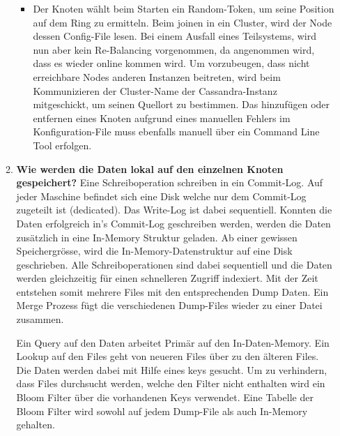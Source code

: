 \documentclass[a4paper,10pt,titlepage=false]{scrreprt}
\begin{document}
\begin{itemize}
\begin{enumerate}
\begin{itemize}
\item Der Knoten wählt beim Starten ein Random-Token, um seine Position auf dem Ring zu ermitteln. Beim joinen in ein Cluster, wird der Node dessen Config-File lesen. Bei einem Ausfall eines Teilsystems, wird nun aber kein Re-Balancing vorgenommen, da angenommen wird, dass es wieder online kommen wird. Um vorzubeugen, dass nicht erreichbare Nodes anderen Instanzen beitreten, wird beim Kommunizieren der Cluster-Name der Cassandra-Instanz mitgeschickt, um seinen Quellort zu bestimmen. Das hinzufügen oder entfernen eines Knoten aufgrund eines manuellen Fehlers im Konfiguration-File muss ebenfalls manuell über ein Command Line Tool erfolgen.
\end{itemize}
\item \textbf{Wie werden die Daten lokal auf den einzelnen Knoten gespeichert?} Eine Schreiboperation schreiben in ein Commit-Log. Auf jeder Maschine befindet sich eine Disk welche nur dem Commit-Log zugeteilt ist (dedicated). Das Write-Log ist dabei sequentiell. Konnten die Daten erfolgreich in's Commit-Log geschreiben werden, werden die Daten zusätzlich in eine In-Memory Struktur geladen. Ab einer gewissen Speichergrösse, wird die In-Memory-Datenstruktur auf eine Disk geschrieben. Alle Schreiboperationen sind dabei sequentiell und die Daten werden gleichzeitig für einen schnelleren Zugriff indexiert. Mit der Zeit entstehen somit mehrere Files mit den entsprechenden Dump Daten. Ein Merge Prozess fügt die verschiedenen Dump-Files wieder zu einer Datei zusammen.

Ein Query auf den Daten arbeitet Primär auf den In-Daten-Memory. Ein Lookup auf den Files geht von neueren Files über zu den älteren Files. Die Daten werden dabei mit Hilfe eines keys gesucht. Um zu verhindern, dass Files durchsucht werden, welche den Filter nicht enthalten wird ein Bloom Filter über die vorhandenen Keys verwendet. Eine Tabelle der Bloom Filter wird sowohl auf jedem Dump-File als auch In-Memory gehalten.
\end{enumerate}


\end{itemize}
\end{document}
